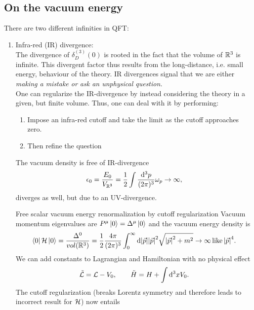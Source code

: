 \subsection{On the vacuum energy}
There are two different infinities in QFT:
\begin{enumerate}
	\item Infra-red (IR) divergence:\\
	The divergence of $\delta^{(3)}_D(0)$ is rooted in the fact that the volume of $\mathbb{R}^3$ is infinite. This divergent factor thus results from the long-distance, i.e. small energy, behaviour of the theory. IR divergences signal that we are either \emph{making a mistake or ask an unphysical question.}\\
	One can regularize the IR-divergence by instead considering the theory in a given, but finite volume. Thus, one can deal with it by performing:
	\begin{enumerate}
		\item Impose an infra-red cutoff and take the limit as the cutoff approaches zero.
		\item Then refine the question
	\end{enumerate}
The vacuum density is free of IR-divergence
\begin{equation}
 \epsilon_0 = \frac{E_0}{V_{\mathbb{R}^3}} = \frac{1}{2} \int \frac{\mathrm{d}^3 p}{(2 \pi)^3} \omega_p \rightarrow \infty,
\end{equation}
diverges as well, but due to an UV-divergence.
\begin{mybox}{Free scalar vacuum energy renormalization by cutoff regularization}
	Vacuum momentum eigenvalues are $P^\mu\ket{0}=\Delta^\mu\ket{0}$ and the vacuum energy density is
	\begin{equation}
	\bra{0}\mathcal{H}\ket{0} = \frac{\Delta^0}{vol(\mathbb{R}^3)} = \frac{1}{2} \frac{4\pi}{(2\pi)^3} \int_0^\infty \mathrm{d} \abs{\vec{p}} \abs{\vec{p}}^2 \sqrt{\abs{\vec{p}}^2+m^2} \rightarrow \infty \mathrm{\, like}\, \abs{\vec{p}}^4.
	\end{equation}
	We can add constants to Lagrangian and Hamiltonian with no physical effect
	\begin{equation}
		\tilde{\mathcal{L}} = \mathcal{L} - V_0,\qquad \tilde{H}=H+\int \mathrm{d}^3 x V_0.
	\end{equation}
	The cutoff regularization (breaks Lorentz symmetry and therefore leads to incorrect result for $\mathcal{H}$) now entails

\end{mybox}
\end{enumerate}
